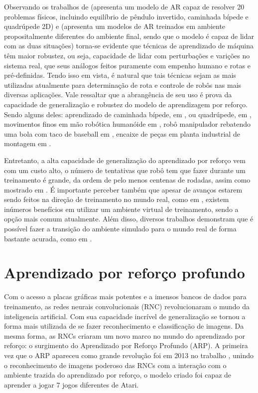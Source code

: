 \documentclass[]{politex}
\begin{document}
Observando os trabalhos de  \cite{Lillicrap} (apresenta um modelo de AR capaz de resolver 20 problemas físicos, incluindo equilíbrio de pêndulo invertido, caminhada bípede e quadrúpede 2D) e \citet{Mankowitz2019} (apresenta um modelos de AR treinados em ambiente propositalmente diferentes do ambiente final, sendo que o modelo é capaz de lidar com as duas situações) torna-se evidente que técnicas de aprendizado de máquina têm maior robustez, ou seja, capacidade de lidar com perturbações e varições no sistema real, que seus análogos feitos puramente com empenho humano e rotas e pré-definidas. Tendo isso em vista, é natural que tais técnicas sejam as mais utilizadas atualmente para determinação de rota e controle de robôs nas mais diversas aplicações. Vale ressaltar que a abrangência de seu uso é prova da capacidade de generalização e robustez do modelo de aprendizagem por reforço. Sendo alguns deles: aprendizado de caminhada bípede, em \cite{kormushev2013reinforcement}, ou quadrúpede, em \cite{Shen2012}, movimentos finos em mão robótica humanóide em \cite{Marcin,OpenAI2019}, robô manipulador rebatendo uma bola com taco de baseball em \cite{Peters2008}, encaixe de peças em planta industrial de montagem em \cite{Luo}.

Entretanto, a alta capacidade de generalização do aprendizado por reforço vem com um custo alto, o número de tentativas que robô tem que fazer durante um treinamento é grande, da ordem de pelo menos centenas de rodadas, assim como mostrado em \cite{kormushev2013reinforcement}. É importante perceber também que apesar de avanços estarem sendo feitos na direção de treinamento no mundo real, como em \cite{Mahmood2018}, existem inúmeros benefícios em utilizar um ambiente virtual de treinamento, sendo a opção mais comum atualmente. Além disso, diversos trabalhos demonstram que é possível fazer a transição do ambiente simulado para o mundo real de forma bastante acurada, como em \cite{Hundt2020, Peng2017, Schwab, Hu2021, Christiano2016, Zhu2021}.

\section{Aprendizado por reforço profundo}

Com o acesso a placas gráficas mais potentes e a imensos bancos de dados para treinamento, as redes neurais convolucionais (RNC) revolucionaram o mundo da inteligencia artificial. Com sua capacidade incrível de generalização se tornou a forma mais utilizada de se fazer reconhecimento e classificação de imagens. Da mesma forma, as RNCs criaram um novo marco no mundo do aprendizado por reforço: o surgimento do Aprendizado por Reforço Profundo (ARP). A primeira vez que o ARP apareceu como grande revolução foi em 2013 no trabalho \citet{Atari}, unindo o reconhecimento de imagens poderoso das RNCs com a interação com o ambiente trazida do aprendizado por reforço, o modelo criado foi capaz de aprender a jogar 7 jogos diferentes de Atari.
\end{document}
